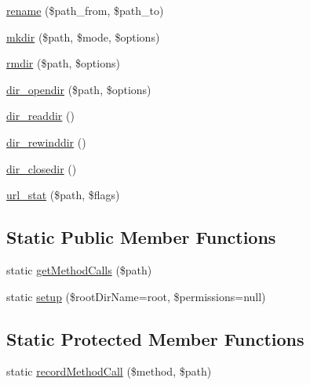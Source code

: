 \begin{DoxyCompactItemize}
\mbox{\hyperlink{classorg_1_1bovigo_1_1vfs_1_1vfs_stream_wrapper_recording_proxy_a6572ee8e63a1c3360385286ac209e0ff}{rename}} (\$path\+\_\+from, \$path\+\_\+to)
\item 
\mbox{\hyperlink{classorg_1_1bovigo_1_1vfs_1_1vfs_stream_wrapper_recording_proxy_a028d2a37cc45234816b36df648b87764}{mkdir}} (\$path, \$mode, \$options)
\item 
\mbox{\hyperlink{classorg_1_1bovigo_1_1vfs_1_1vfs_stream_wrapper_recording_proxy_a62be97a557af790550eb7558dfa5859a}{rmdir}} (\$path, \$options)
\item 
\mbox{\hyperlink{classorg_1_1bovigo_1_1vfs_1_1vfs_stream_wrapper_recording_proxy_ae6bbfde9534ee882c5e750dc64391762}{dir\+\_\+opendir}} (\$path, \$options)
\item 
\mbox{\hyperlink{classorg_1_1bovigo_1_1vfs_1_1vfs_stream_wrapper_recording_proxy_aa4876e0cb8d21e65c36ca6243e6f5182}{dir\+\_\+readdir}} ()
\item 
\mbox{\hyperlink{classorg_1_1bovigo_1_1vfs_1_1vfs_stream_wrapper_recording_proxy_afd6e9558104fd35d07fb3a7412ea0d90}{dir\+\_\+rewinddir}} ()
\item 
\mbox{\hyperlink{classorg_1_1bovigo_1_1vfs_1_1vfs_stream_wrapper_recording_proxy_a9f2a581f636224b826e531c63953a907}{dir\+\_\+closedir}} ()
\item 
\mbox{\hyperlink{classorg_1_1bovigo_1_1vfs_1_1vfs_stream_wrapper_recording_proxy_abcc2fea2362bdc22b2a1c9387176429c}{url\+\_\+stat}} (\$path, \$flags)
\end{DoxyCompactItemize}
\subsection*{Static Public Member Functions}
\begin{DoxyCompactItemize}
\item 
static \mbox{\hyperlink{classorg_1_1bovigo_1_1vfs_1_1vfs_stream_wrapper_recording_proxy_a8790c347ad9e9926ddc64101cf065ec7}{get\+Method\+Calls}} (\$path)
\item 
static \mbox{\hyperlink{classorg_1_1bovigo_1_1vfs_1_1vfs_stream_wrapper_recording_proxy_a65a06bd87e0247d481d9ea101c89bf9b}{setup}} (\$root\+Dir\+Name=\textquotesingle{}root\textquotesingle{}, \$permissions=null)
\end{DoxyCompactItemize}
\subsection*{Static Protected Member Functions}
\begin{DoxyCompactItemize}
\item 
static \mbox{\hyperlink{classorg_1_1bovigo_1_1vfs_1_1vfs_stream_wrapper_recording_proxy_ad0740d472a79bc186d596ca2f30a9bbd}{record\+Method\+Call}} (\$method, \$path)
\end{DoxyCompactItemize}
